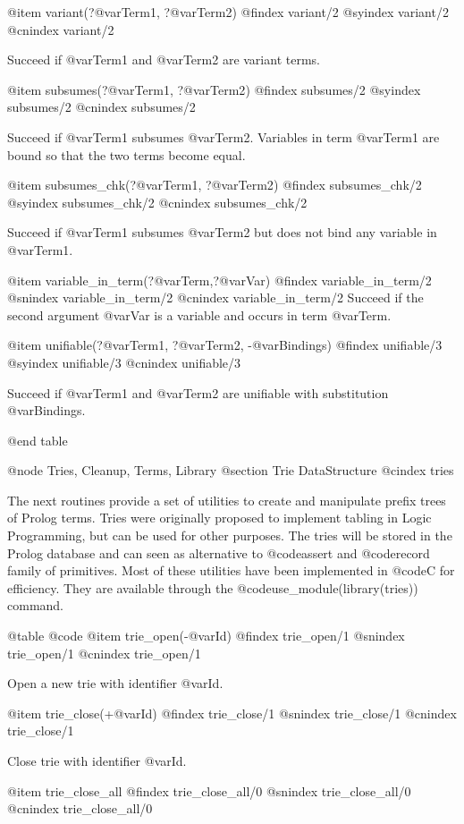 {{{{{{{{{@item variant(?@var{Term1}, ?@var{Term2})
@findex  variant/2
@syindex variant/2
@cnindex variant/2

Succeed if @var{Term1} and @var{Term2} are variant terms.

@item subsumes(?@var{Term1}, ?@var{Term2})
@findex  subsumes/2
@syindex subsumes/2
@cnindex subsumes/2

Succeed if @var{Term1} subsumes @var{Term2}.  Variables in term
@var{Term1} are bound so that the two terms become equal.


@item subsumes_chk(?@var{Term1}, ?@var{Term2})
@findex  subsumes_chk/2
@syindex subsumes_chk/2
@cnindex subsumes_chk/2

Succeed if @var{Term1} subsumes @var{Term2} but does not bind any
variable in @var{Term1}.

@item variable_in_term(?@var{Term},?@var{Var})
@findex variable_in_term/2
@snindex variable_in_term/2
@cnindex variable_in_term/2
Succeed if the second argument @var{Var} is a variable and occurs in
term @var{Term}.

@item unifiable(?@var{Term1}, ?@var{Term2}, -@var{Bindings})
@findex  unifiable/3
@syindex unifiable/3
@cnindex unifiable/3

Succeed if @var{Term1} and @var{Term2} are unifiable with substitution
@var{Bindings}.

@end table

@node Tries, Cleanup, Terms, Library
@section Trie DataStructure
@cindex tries

The next routines provide a set of utilities to create and manipulate
prefix trees of Prolog terms. Tries were originally proposed to
implement tabling in Logic Programming, but can be used for other
purposes. The tries will be stored in the Prolog database and can seen
as alternative to @code{assert} and @code{record} family of
primitives. Most of these utilities have been implemented in @code{C}
for efficiency. They are available through the
@code{use_module(library(tries))} command.

@table @code
@item trie_open(-@var{Id})
@findex trie_open/1
@snindex trie_open/1
@cnindex trie_open/1

Open a new trie with identifier @var{Id}.

@item trie_close(+@var{Id})
@findex trie_close/1
@snindex trie_close/1
@cnindex trie_close/1

Close trie with identifier @var{Id}.

@item trie_close_all
@findex trie_close_all/0
@snindex trie_close_all/0
@cnindex trie_close_all/0

}}}}}}}}}
